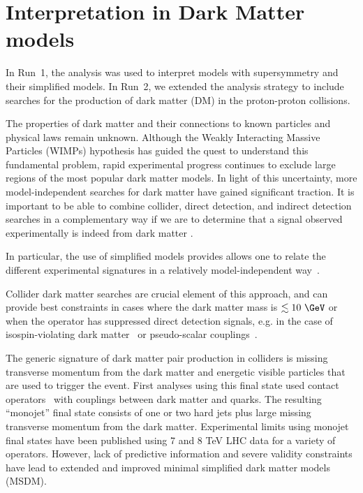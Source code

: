 \section{Interpretation in Dark Matter models}
\label{sec:darkmatter}

In Run~1, the \alphat analysis was used to interpret models with supersymmetry and their simplified models. In Run~2, we extended the analysis strategy to include searches for the production 
of dark matter (DM) in the proton-proton collisions.

The properties of dark matter and their connections to known particles and physical laws remain unknown. Although the Weakly Interacting Massive
Particles (WIMPs) hypothesis has guided the quest to understand this fundamental problem, rapid experimental progress continues to exclude
large regions of the most popular dark matter models. In light of this uncertainty, more model-independent searches for dark matter have gained
significant traction. It is important to be able to combine collider, direct detection, and indirect detection searches in a complementary way
if we are to determine that a signal observed experimentally is indeed from dark matter \cite{Bauer:2013ihz}.

In particular, the use of simplified models provides allows one to relate the different experimental signatures in a relatively model-independent way~\cite{Buchmueller:2014yoa}. 

Collider dark matter searches are crucial element of this approach, and can provide best constraints in cases where the dark matter mass is $\lesssim 10\ \GeV$ or when the operator 
has suppressed direct detection signals, e.g. in the case of isospin-violating dark matter~\cite{Feng:2011vu} or pseudo-scalar couplings~\cite{Buckley:2014fba}. 

The generic signature of dark matter pair production in colliders is missing transverse momentum from the  dark matter and energetic visible particles that are used to trigger the event. First analyses using this final state  used contact operators~\cite{Goodman:2010ku} with couplings between dark matter and quarks. The resulting ``monojet'' final state consists of one or two hard jets plus large missing transverse momentum from the dark matter. Experimental limits using monojet final states have been published using 7 and 8 TeV LHC data \cite{Chatrchyan:2012me,ATLAS:2012ky} for a variety of operators.
However, lack of predictive information and severe validity constraints have lead to extended and improved minimal simplified dark matter models (MSDM). 


